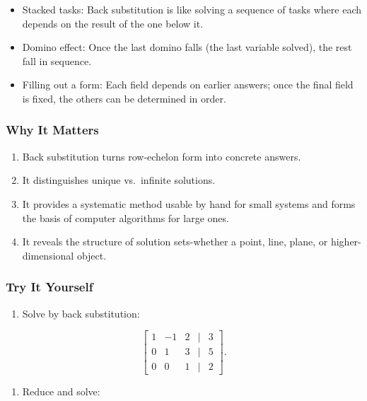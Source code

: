 \documentclass[
  letterpaper,
  DIV=11,
  numbers=noendperiod]{scrreprt}
\providecommand{\tightlist}{%
  \setlength{\itemsep}{0pt}\setlength{\parskip}{0pt}}
\begin{document}
\begin{itemize}
\tightlist
\item
  Stacked tasks: Back substitution is like solving a sequence of tasks
  where each depends on the result of the one below it.
\item
  Domino effect: Once the last domino falls (the last variable solved),
  the rest fall in sequence.
\item
  Filling out a form: Each field depends on earlier answers; once the
  final field is fixed, the others can be determined in order.
\end{itemize}

\subsubsection{Why It Matters}\label{why-it-matters-24}

\begin{enumerate}
\def\labelenumi{\arabic{enumi}.}
\tightlist
\item
  Back substitution turns row-echelon form into concrete answers.
\item
  It distinguishes unique vs.~infinite solutions.
\item
  It provides a systematic method usable by hand for small systems and
  forms the basis of computer algorithms for large ones.
\item
  It reveals the structure of solution sets-whether a point, line,
  plane, or higher-dimensional object.
\end{enumerate}

\subsubsection{Try It Yourself}\label{try-it-yourself-27}

\begin{enumerate}
\def\labelenumi{\arabic{enumi}.}
\tightlist
\item
  Solve by back substitution:
\end{enumerate}

\[
\begin{bmatrix}  
1 & -1 & 2 & | & 3 \\  
0 & 1 & 3 & | & 5 \\  
0 & 0 & 1 & | & 2  
\end{bmatrix}.
\]

\begin{enumerate}
\def\labelenumi{\arabic{enumi}.}
\setcounter{enumi}{1}
\tightlist
\item
  Reduce and solve:
\end{enumerate}
\end{document}
